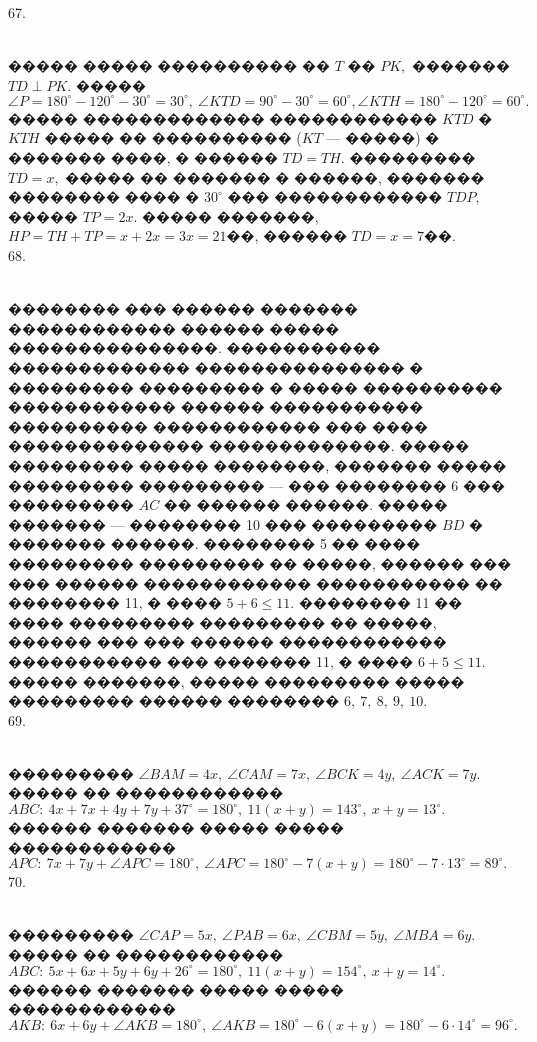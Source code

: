 \documentclass[12pt]{article}
\begin{document}
67. \begin{figure}[ht!]
\end{figure}\\
����� ����� ���������� �� $T$ �� $PK,$ ������� $TD\perp PK.$ ����� $\angle P=180^\circ-120^\circ-30^\circ=30^\circ,\ \angle KTD=90^\circ-30^\circ=60^\circ, \angle KTH=180^\circ-120^\circ=60^\circ.$ ����� ������������� ������������ $KTD$ � $KTH$ ����� �� ���������� ($KT$ --- �����) � ������� ����, � ������ $TD=TH.$ ��������� $TD=x,$ ����� �� ������� � ������, ������� �������� ���� � $30^\circ$ ��� ������������ $TDP,$ ����� $TP=2x.$ ����� �������, $HP=TH+TP=x+2x=3x=21$��, ������ $TD=x=7$��.\\
68. \begin{figure}[ht!]
\end{figure}\\
�������� ��� ������ ������� ������������ ������ ����� ���������������. ����������� ������������� ��������������� � ��������� ��������� � ����� ���������� ������������ ������ ����������� ���������� ������������ ��� ���� �������������� �������������. ����� ��������� ����� ��������, ������� ����� ��������� ��������� --- ��� �������� 6 ��� ��������� $AC$ �� ������ ������. ����� ������� --- �������� 10 ��� ��������� $BD$ � ������� ������. �������� 5 �� ���� ��������� ��������� �� �����, ������ ��� ��� ������ ������������ ����������� �� �������� 11, � ���� $5+6\leqslant11.$ �������� 11 �� ���� ��������� ��������� �� �����, ������ ��� ��� ������ ������������ ����������� ��� ������� 11, � ���� $6+5\leqslant11.$ ����� �������, ����� ��������� ����� ��������� ������ �������� $6,\ 7,\ 8,\ 9,\ 10.$\\
69. \begin{figure}[ht!]
\end{figure}\\
��������� $\angle BAM=4x,\ \angle CAM=7x,\ \angle BCK=4y,\ \angle ACK=7y.$ ����� �� ������������ $ABC:\ 4x+7x+4y+7y+37^\circ=180^\circ,\ 11(x+y)=143^\circ,\ x+y=13^\circ.$ ������ ������� ����� ����� ������������ $APC:\ 7x+7y+\angle APC=180^\circ,\ \angle APC=180^\circ-7(x+y)=180^\circ-7\cdot13^\circ=89^\circ.$\\
70. \begin{figure}[ht!]
\end{figure}\\
��������� $\angle CAP=5x,\ \angle PAB=6x,\ \angle CBM=5y,\ \angle MBA=6y.$ ����� �� ������������ $ABC:\ 5x+6x+5y+6y+26^\circ=180^\circ,\ 11(x+y)=154^\circ,\ x+y=14^\circ.$ ������ ������� ����� ����� ������������ $AKB:\ 6x+6y+\angle AKB=180^\circ,\ \angle AKB=180^\circ-6(x+y)=180^\circ-6\cdot14^\circ=96^\circ.$\\
\end{document}
